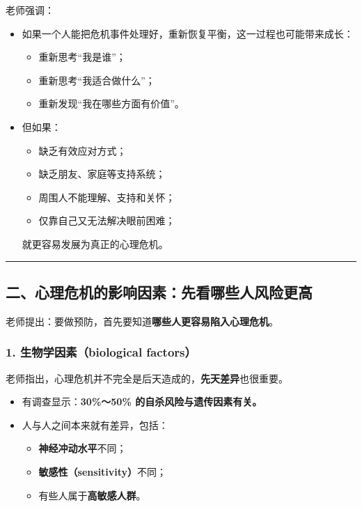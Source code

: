 \documentclass[
  chinese,
  9pt,
  a4paper,
]{ctexart}
\providecommand{\tightlist}{%
  \setlength{\itemsep}{0pt}\setlength{\parskip}{0pt}}
\begin{document}
老师强调：

\begin{itemize}
\item
  如果一个人能把危机事件处理好，重新恢复平衡，这一过程也可能带来成长：

  \begin{itemize}
  \tightlist
  \item
    重新思考``我是谁''；
  \item
    重新思考``我适合做什么''；
  \item
    重新发现``我在哪些方面有价值''。
  \end{itemize}
\item
  但如果：

  \begin{itemize}
  \tightlist
  \item
    缺乏有效应对方式；
  \item
    缺乏朋友、家庭等支持系统；
  \item
    周围人不能理解、支持和关怀；
  \item
    仅靠自己又无法解决眼前困难；
  \end{itemize}

  就更容易发展为真正的心理危机。
\end{itemize}

\begin{center}\rule{0.5\linewidth}{0.5pt}\end{center}

\subsection{二、心理危机的影响因素：先看哪些人风险更高}\label{ux4e8cux5fc3ux7406ux5371ux673aux7684ux5f71ux54cdux56e0ux7d20ux5148ux770bux54eaux4e9bux4ebaux98ceux9669ux66f4ux9ad8}

老师提出：要做预防，首先要知道\textbf{哪些人更容易陷入心理危机}。

\subsubsection{1. 生物学因素（biological
factors）}\label{ux751fux7269ux5b66ux56e0ux7d20biological-factors}

老师指出，心理危机并不完全是后天造成的，\textbf{先天差异}也很重要。

\begin{itemize}
\item
  有调查显示：\textbf{30\%～50\% 的自杀风险与遗传因素有关。}
\item
  人与人之间本来就有差异，包括：

  \begin{itemize}
  \tightlist
  \item
    \textbf{神经冲动水平}不同；
  \item
    \textbf{敏感性（sensitivity）}不同；
  \item
    有些人属于\textbf{高敏感人群}。
  \end{itemize}
\end{itemize}
\end{document}
